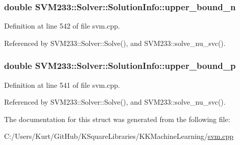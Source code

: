 \subsubsection[{\texorpdfstring{upper\+\_\+bound\+\_\+n}{upper_bound_n}}]{\setlength{\rightskip}{0pt plus 5cm}double S\+V\+M233\+::\+Solver\+::\+Solution\+Info\+::upper\+\_\+bound\+\_\+n}\hypertarget{struct_s_v_m233_1_1_solver_1_1_solution_info_af558f84aa80ea9c97730c0cd0dca7ef9}{}\label{struct_s_v_m233_1_1_solver_1_1_solution_info_af558f84aa80ea9c97730c0cd0dca7ef9}


Definition at line 542 of file svm.\+cpp.



Referenced by S\+V\+M233\+::\+Solver\+::\+Solve(), and S\+V\+M233\+::solve\+\_\+nu\+\_\+svc().

\subsubsection[{\texorpdfstring{upper\+\_\+bound\+\_\+p}{upper_bound_p}}]{\setlength{\rightskip}{0pt plus 5cm}double S\+V\+M233\+::\+Solver\+::\+Solution\+Info\+::upper\+\_\+bound\+\_\+p}\hypertarget{struct_s_v_m233_1_1_solver_1_1_solution_info_a14db95d53a62445ec92ddea0b6ee17d4}{}\label{struct_s_v_m233_1_1_solver_1_1_solution_info_a14db95d53a62445ec92ddea0b6ee17d4}


Definition at line 541 of file svm.\+cpp.



Referenced by S\+V\+M233\+::\+Solver\+::\+Solve(), and S\+V\+M233\+::solve\+\_\+nu\+\_\+svc().



The documentation for this struct was generated from the following file\+:\begin{DoxyCompactItemize}
\item 
C\+:/\+Users/\+Kurt/\+Git\+Hub/\+K\+Square\+Libraries/\+K\+K\+Machine\+Learning/\hyperlink{svm_8cpp}{svm.\+cpp}\end{DoxyCompactItemize}
